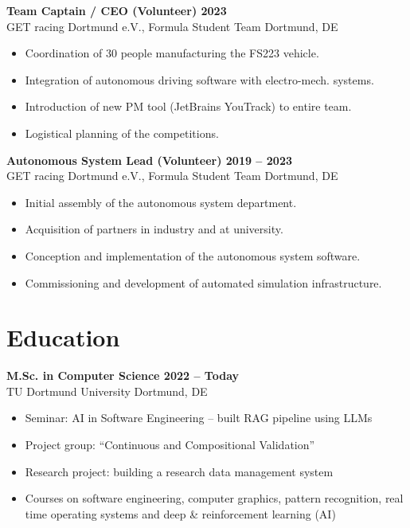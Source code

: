 \documentclass[a4paper,11pt]{article}
\newcommand{\subsectionskip}[0]{\vspace{0.125cm}}
\newcommand{\col}[2]{\textcolor[HTML]{#1}{#2}}
\begin{document}
\begin{minipage}[t]{0.65\textwidth}
    \subsectionskip

    \col{ab8064}{\textbf{Team Captain / CEO (Volunteer) \hfill 2023}} \\
    GET racing Dortmund e.V., Formula Student Team \hfill Dortmund, DE
    \begin{itemize}
        \small
        \item Coordination of 30 people manufacturing the FS223 vehicle.
        \item Integration of autonomous driving software with electro-mech. systems.
        \item Introduction of new PM tool (JetBrains YouTrack) to entire team.
        \item Logistical planning of the competitions.
    \end{itemize}

    \subsectionskip

    \col{9c7d6c}{\textbf{Autonomous System Lead (Volunteer) \hfill 2019 -- 2023}} \\
    GET racing Dortmund e.V., Formula Student Team \hfill Dortmund, DE
    \begin{itemize}
        \small
        \item Initial assembly of the autonomous system department.
        \item Acquisition of partners in industry and at university.
        \item Conception and implementation of the autonomous system software.
        \item Commissioning and development of automated simulation infrastructure.
    \end{itemize}

    \section*{\col{7e7576}{Education}}
    \col{7f7679}{\textbf{M.Sc. in Computer Science \hfill 2022 -- Today}} \\
    TU Dortmund University \hfill Dortmund, DE
    \begin{itemize}
        \small
        \item Seminar: AI in Software Engineering -- built RAG pipeline using LLMs
        \item Project group: \enquote{Continuous and Compositional Validation}
        \item Research project: building a research data management system
        \item Courses on software engineering, computer graphics, pattern recognition, real time operating systems and deep \& reinforcement learning (AI)
    \end{itemize}


\end{minipage}
\end{document}
